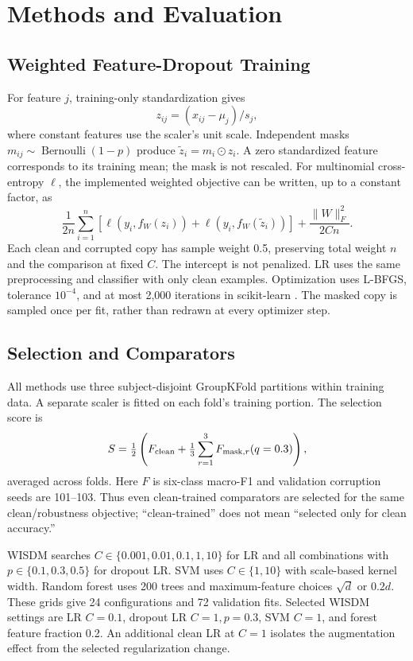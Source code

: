 \documentclass[conference]{IEEEtran}
\begin{document}
\section{Methods and Evaluation}
\subsection{Weighted Feature-Dropout Training}
For feature $j$, training-only standardization gives
\begin{equation}
z_{ij}=(x_{ij}-\mu_j)/s_j,
\end{equation}
where constant features use the scaler's unit scale. Independent masks $m_{ij}\sim\operatorname{Bernoulli}(1-p)$ produce $\tilde z_i=m_i\odot z_i$. A zero standardized feature corresponds to its training mean; the mask is not rescaled. For multinomial cross-entropy $\ell$, the implemented weighted objective can be written, up to a constant factor, as
\begin{equation}
\frac{1}{2n}\sum_{i=1}^{n}\!\left[\ell(y_i,f_W(z_i))+\ell(y_i,f_W(\tilde z_i))\right]
+\frac{\lVert W\rVert_F^2}{2Cn}.
\end{equation}
Each clean and corrupted copy has sample weight 0.5, preserving total weight $n$ and the comparison at fixed $C$. The intercept is not penalized. LR uses the same preprocessing and classifier with only clean examples. Optimization uses L-BFGS, tolerance $10^{-4}$, and at most 2,000 iterations in scikit-learn \cite{pedregosa2011sklearn}. The masked copy is sampled once per fit, rather than redrawn at every optimizer step.

\subsection{Selection and Comparators}
All methods use three subject-disjoint GroupKFold partitions within training data. A separate scaler is fitted on each fold's training portion. The selection score is
\begin{equation}
S=\tfrac12\left(F_{\rm clean}+\tfrac13\sum_{r=1}^{3}F_{{\rm mask},r}(q=0.3)\right),
\end{equation}
averaged across folds. Here $F$ is six-class macro-F1 and validation corruption seeds are 101--103. Thus even clean-trained comparators are selected for the same clean/robustness objective; ``clean-trained'' does not mean ``selected only for clean accuracy.''

WISDM searches $C\in\{0.001,0.01,0.1,1,10\}$ for LR and all combinations with $p\in\{0.1,0.3,0.5\}$ for dropout LR. SVM \cite{cortes1995} uses $C\in\{1,10\}$ with scale-based kernel width. Random forest \cite{breiman2001} uses 200 trees and maximum-feature choices $\sqrt d$ or $0.2d$. These grids give 24 configurations and 72 validation fits. Selected WISDM settings are LR $C=0.1$, dropout LR $C=1,p=0.3$, SVM $C=1$, and forest feature fraction 0.2. An additional clean LR at $C=1$ isolates the augmentation effect from the selected regularization change.
\end{document}

